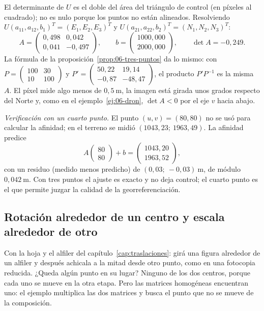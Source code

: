\begin{ejemplo}
\[\]
El determinante de \(U\) es el doble del área del triángulo de control (en píxeles al
cuadrado); no es nulo porque los puntos no están alineados. Resolviendo
\(U(a_{11},a_{12},b_1)^T=(E_1,E_2,E_3)^T\) y \(U(a_{21},a_{22},b_2)^T=(N_1,N_2,N_3)^T\):
\[
  A=\begin{pmatrix}0{,}498&0{,}042\\0{,}041&-0{,}497\end{pmatrix},
  \qquad
  b=\begin{pmatrix}1000{,}000\\2000{,}000\end{pmatrix},
  \qquad
  \det A=-0{,}249 .
\]
La fórmula de la proposición~\ref{prop:06-tres-puntos} da lo mismo: con
\(P=\begin{pmatrix}100&30\\10&100\end{pmatrix}\) y
\(P'=\begin{pmatrix}50{,}22&19{,}14\\-0{,}87&-48{,}47\end{pmatrix}\), el producto \(P'P^{-1}\)
es la misma \(A\). El píxel mide algo menos de \(0{,}5\ \mathrm{m}\), la imagen está girada
unos grados respecto del Norte y, como en el ejemplo~\ref{ej:06-dron}, \(\det A<0\) por el
eje \(v\) hacia abajo.

\emph{Verificación con un cuarto punto.} El punto \((u,v)=(80,80)\) no se usó para calcular
la afinidad; en el terreno se midió \((1043{,}23;\ 1963{,}49)\). La afinidad predice
\[
  A\begin{pmatrix}80\\80\end{pmatrix}+b
  =\begin{pmatrix}1043{,}20\\1963{,}52\end{pmatrix},
\]
con un residuo (medido menos predicho) de \((0{,}03;\ -0{,}03)\ \mathrm{m}\), de módulo
\(0{,}042\ \mathrm{m}\). Con tres puntos el ajuste es exacto y no deja control; el cuarto
punto es el que permite juzgar la calidad de la georreferenciación.
\end{ejemplo}

\subsection{Rotación alrededor de un centro y escala alrededor de otro}\label{sec:06-rot-escala}

Con la hoja y el alfiler del capítulo~\ref{cap:traslaciones}: girá una figura alrededor de un
alfiler y después achicala a la mitad desde otro punto, como en una fotocopia reducida. ¿Queda
algún punto en su lugar? Ninguno de los dos centros, porque cada uno se mueve en la otra etapa.
Pero las matrices homogéneas encuentran uno: el ejemplo multiplica las dos matrices y busca el
punto que no se mueve de la composición.

